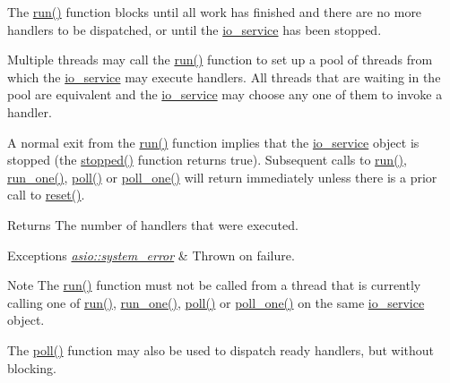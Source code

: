 The \hyperlink{classasio_1_1io__service_ac84bed0d1dd061bc71010ba1228439da}{run()} function blocks until all work has finished and there are no more handlers to be dispatched, or until the \hyperlink{classasio_1_1io__service}{io\+\_\+service} has been stopped.

Multiple threads may call the \hyperlink{classasio_1_1io__service_ac84bed0d1dd061bc71010ba1228439da}{run()} function to set up a pool of threads from which the \hyperlink{classasio_1_1io__service}{io\+\_\+service} may execute handlers. All threads that are waiting in the pool are equivalent and the \hyperlink{classasio_1_1io__service}{io\+\_\+service} may choose any one of them to invoke a handler.

A normal exit from the \hyperlink{classasio_1_1io__service_ac84bed0d1dd061bc71010ba1228439da}{run()} function implies that the \hyperlink{classasio_1_1io__service}{io\+\_\+service} object is stopped (the \hyperlink{classasio_1_1io__service_aff0b3c3231f7a1fb9156489fc19481e8}{stopped()} function returns {\ttfamily true}). Subsequent calls to \hyperlink{classasio_1_1io__service_ac84bed0d1dd061bc71010ba1228439da}{run()}, \hyperlink{classasio_1_1io__service_aa83c06ec5cc7bde25c64d89530998408}{run\+\_\+one()}, \hyperlink{classasio_1_1io__service_afcc99e506862edaf34ac124c0e7f0242}{poll()} or \hyperlink{classasio_1_1io__service_acbdbe60a4582f7f77f5bdb85d4e76013}{poll\+\_\+one()} will return immediately unless there is a prior call to \hyperlink{classasio_1_1io__service_a28a4283881eba54d415409ad604384f8}{reset()}.

\begin{DoxyReturn}{Returns}
The number of handlers that were executed.
\end{DoxyReturn}

\begin{DoxyExceptions}{Exceptions}
{\em \hyperlink{classasio_1_1system__error}{asio\+::system\+\_\+error}} & Thrown on failure.\\
\hline
\end{DoxyExceptions}
\begin{DoxyNote}{Note}
The \hyperlink{classasio_1_1io__service_ac84bed0d1dd061bc71010ba1228439da}{run()} function must not be called from a thread that is currently calling one of \hyperlink{classasio_1_1io__service_ac84bed0d1dd061bc71010ba1228439da}{run()}, \hyperlink{classasio_1_1io__service_aa83c06ec5cc7bde25c64d89530998408}{run\+\_\+one()}, \hyperlink{classasio_1_1io__service_afcc99e506862edaf34ac124c0e7f0242}{poll()} or \hyperlink{classasio_1_1io__service_acbdbe60a4582f7f77f5bdb85d4e76013}{poll\+\_\+one()} on the same \hyperlink{classasio_1_1io__service}{io\+\_\+service} object.
\end{DoxyNote}
The \hyperlink{classasio_1_1io__service_afcc99e506862edaf34ac124c0e7f0242}{poll()} function may also be used to dispatch ready handlers, but without blocking. 

